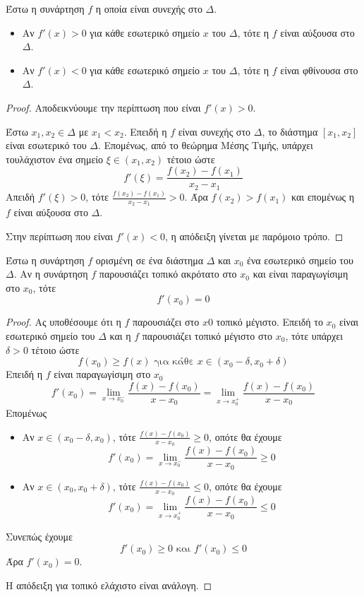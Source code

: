 \documentclass[a4paper, 12pt]{article}
\begin{document}
\begin{theorem}{}
  Έστω η συνάρτηση $f$ η οποία είναι συνεχής στο $Δ$.
  \begin{itemize}
    \item Αν $f'(x)>0$ για κάθε εσωτερικό σημείο $x$ του $Δ$, τότε η $f$ είναι αύξουσα στο $Δ$.
    \item Αν $f'(x)<0$ για κάθε εσωτερικό σημείο $x$ του $Δ$, τότε η $f$ είναι φθίνουσα στο $Δ$.
  \end{itemize}
\end{theorem}
\begin{proof}
  Αποδεικνύουμε την περίπτωση που είναι $f'(x)>0$.

  Έστω $x_1,x_2\in Δ$ με $x_1<x_2$. Επειδή η $f$ είναι συνεχής στο $Δ$, το διάστημα $[x_1,x_2]$ είναι εσωτερικό του $Δ$. Επομένως, από το θεώρημα Μέσης Τιμής, υπάρχει τουλάχιστον ένα σημείο $ξ\in (x_1,x_2)$ τέτοιο ώστε
  $$f'(ξ)=\frac{f(x_2)-f(x_1)}{x_2-x_1}$$
  Απειδή $f'(ξ)>0$, τότε $\frac{f(x_2)-f(x_1)}{x_2-x_1}>0$. Άρα $f(x_2)>f(x_1)$ και επομένως η $f$ είναι αύξουσα στο $Δ$.

  Στην περίπτωση που είναι  $f'(x)<0$, η απόδειξη γίνεται με παρόμοιο τρόπο.
\end{proof}

\begin{theorem}{}
  Έστω η συνάρτηση $f$ ορισμένη σε ένα διάστημα $Δ$ και $x_0$ ένα εσωτερικό σημείο του $Δ$. Αν η συνάρτηση $f$ παρουσιάζει τοπικό ακρότατο στο $x_0$ και είναι παραγωγίσιμη στο $x_0$, τότε
  $$f'(x_0)=0$$
\end{theorem}
\begin{proof}
  Ας υποθέσουμε ότι η $f$ παρουσιάζει στο $x0$ τοπικό μέγιστο.
  Επειδή το $x_0$ είναι εσωτερικό σημείο του $Δ$ και η $f$ παρουσιάζει τοπικό μέγιστο στο $x_0$, τότε υπάρχει $δ>0$ τέτοιο ώστε
  $$f(x_0)\geq f(x) \text{ για κάθε } x\in (x_0-δ,x_0+δ)$$
  Επειδή η $f$ είναι παραγωγίσιμη στο $x_0$
  $$f'(x_0)=\lim_{x\to x_0^-} \dfrac{f(x)-f(x_0)}{x-x_0}=\lim_{x\to x_0^+} \dfrac{f(x)-f(x_0)}{x-x_0}$$
  Επομένως
  \begin{itemize}
    \item Αν $x\in (x_0-δ,x_0)$, τότε $\frac{f(x)-f(x_0)}{x-x_0}\geq 0$, οπότε θα έχουμε
          $$f'(x_0)=\lim_{x\to x_0^-} \frac{f(x)-f(x_0)}{x-x_0}\geq 0$$
    \item Αν $x\in (x_0,x_0+δ)$, τότε $\frac{f(x)-f(x_0)}{x-x_0}\leq 0$, οπότε θα έχουμε
          $$f'(x_0)=\lim_{x\to x_0^+} \frac{f(x)-f(x_0)}{x-x_0}\leq 0$$
  \end{itemize}
  Συνεπώς έχουμε
  $$f'(x_0)\geq 0 \text{ και } f'(x_0)\leq 0$$
  Άρα $f'(x_0)=0$.

  Η απόδειξη για τοπικό ελάχιστο είναι ανάλογη.
\end{proof}
\end{document}
